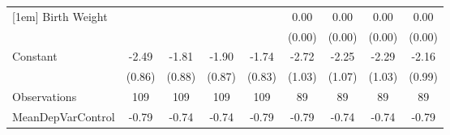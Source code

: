 {\begin{tabular}{l*{8}{c}}
[1em]
Birth Weight        &                     &                     &                     &                     &        0.00\sym{*}  &        0.00\sym{*}  &        0.00         &        0.00         \\
                    &                     &                     &                     &                     &      (0.00)         &      (0.00)         &      (0.00)         &      (0.00)         \\
[1em]
Constant            &       -2.49\sym{***}&       -1.81\sym{**} &       -1.90\sym{**} &       -1.74\sym{**} &       -2.72\sym{***}&       -2.25\sym{**} &       -2.29\sym{**} &       -2.16\sym{**} \\
                    &      (0.86)         &      (0.88)         &      (0.87)         &      (0.83)         &      (1.03)         &      (1.07)         &      (1.03)         &      (0.99)         \\
\hline
Observations        &         109         &         109         &         109         &         109         &          89         &          89         &          89         &          89         \\
MeanDepVarControl   &       -0.79         &       -0.74         &       -0.74         &       -0.79         &       -0.79         &       -0.74         &       -0.74         &       -0.79         \\
\hline\hline
\end{tabular}
}

